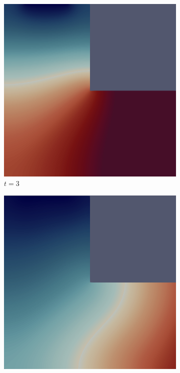 \vfill\pagebreak

\begin{figure}[H]
    \centering
    \caption{$L$-shape with a Sink and Source: State Solution}
    \begin{subfigure}{.4\textwidth}
        \includegraphics[width=\textwidth]{imgs/LShapeSource_Solution/first.png}
        \caption{$t = 3$}
    \end{subfigure}
    \begin{subfigure}{.4\textwidth}
        \includegraphics[width=\textwidth]{imgs/LShapeSource_Solution/second.png}

\end{subfigure}
\end{figure}

